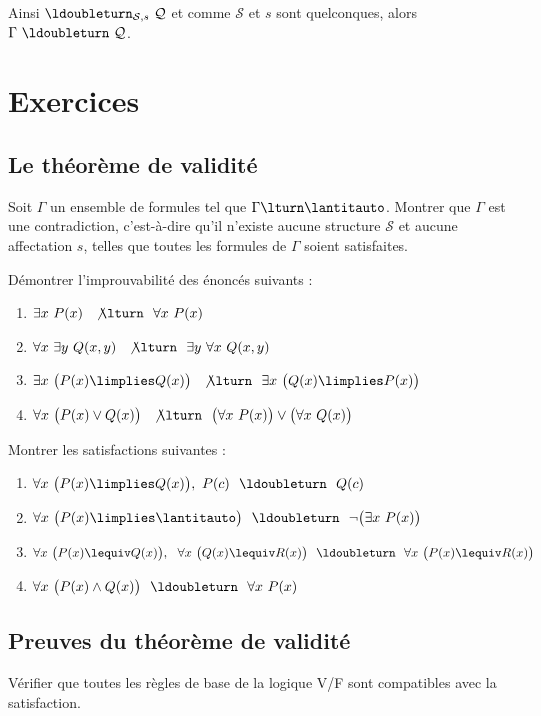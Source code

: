 \documentclass[11pt,class=report,crop=false]{standalone}
\begin{document}
Ainsi $\ldoubleturn_{\mathcal{S},s} \ \mathcal{Q}$ et comme $\mathcal{S}$ et $s$ sont quelconques, alors $\Gamma \ \ldoubleturn \ \mathcal{Q}$.


\section*{Exercices}

\subsection*{Le théorème de validité}

\begin{exercicecours}
Soit $\Gamma$ un ensemble de formules tel que $\Gamma \lturn \lantitauto$.
Montrer que $\Gamma$ est une contradiction, c'est-à-dire qu'il n'existe aucune structure $\mathcal{S}$ et aucune affectation $s$, telles que toutes les formules de $\Gamma$ soient satisfaites.
\end{exercicecours}


\begin{exercicecours}
Démontrer l'improuvabilité des énoncés suivants :
\begin{enumerate}
	\item $\exists x \ P(x) \ \ \not\lturn \ \ \forall x \ P(x)$  
	
	\item $\forall x \ \exists y \ Q(x,y) \ \ \not\lturn \ \ \exists y \ \forall x \ Q(x,y)$
	
	\item $\exists x \ \big( P(x) \limplies Q(x) \big) \ \ \not\lturn \ \ \exists x \ \big( Q(x) \limplies P(x) \big)$
	
	\item $\forall x \ \big( P(x) \lor Q(x) \big)  \ \ \not\lturn \ \ \big(\forall x \ P(x)\big) \lor \big(\forall x \ Q(x)\big)$
\end{enumerate}
\end{exercicecours}


\begin{exercicecours}
Montrer les satisfactions suivantes :
\begin{enumerate}
	\item $\forall x \ \big( P(x) \limplies Q(x) \big), \ P(c) \ \ \ldoubleturn \ \ Q(c)$
	
	\item $\forall x \ \big( P(x) \limplies \lantitauto \big) \ \ \ldoubleturn \ \ \lnot\big( \exists x \ P(x) \big)$
	
	\item $\forall x \ \big( P(x) \lequiv Q(x) \big), \ \ \forall x \ \big( Q(x) \lequiv R(x) \big)  \ \ \ldoubleturn \ \ \forall x \ \big( P(x) \lequiv R(x) \big)$
	
	\item $\forall x \ \big( P(x) \land Q(x) \big) \ \ \ldoubleturn \ \ \forall x \  P(x)$
\end{enumerate}	
\end{exercicecours}


\subsection*{Preuves du théorème de validité}

\begin{exercicecours}
	Vérifier que toutes les règles de base de la logique V/F sont compatibles avec la satisfaction.
\end{exercicecours}
\end{document}
